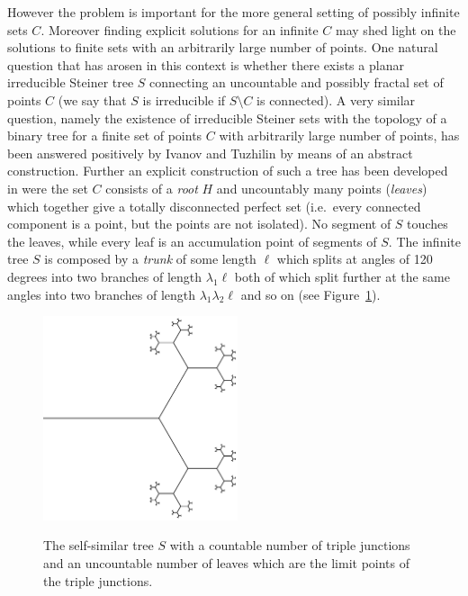 \documentclass{amsart}
\theoremstyle{definition}
\theoremstyle{remark}
\begin{document}
However the problem is important for the more general setting of possibly infinite 
sets $C$. 
Moreover finding explicit solutions for an infinite $C$ may shed light on 
the solutions to finite sets with an arbitrarily large number of points.
One natural question that has arosen in this context is 
whether there exists a planar irreducible Steiner tree $S$ connecting an uncountable 
and possibly fractal set of points $C$ 
(we say that $S$ is irreducible if $S\setminus C$ is 
connected).
A very similar question,
namely the existence of irreducible Steiner sets with the topology 
of a binary tree for a finite set of points $C$ with arbitrarily 
large number of points, has been answered positively by Ivanov and 
Tuzhilin \cite{IvaTuz94} by means of an abstract construction.
Further an explicit construction of such a tree has been developed
in \cite{PaoSteTep15} were the set $C$ consists of a \emph{root} $H$ and uncountably many
points (\emph{leaves}) which together give a totally disconnected perfect set 
(i.e.\ every connected component is a point, but the points are not isolated).
No segment of $S$
touches the leaves, while every leaf is an accumulation point of
segments of $S$.
The infinite tree $S$ 
is composed by a \emph{trunk} of
some length $\ell$ which splits at angles of 120 degrees 
into two branches of length $\lambda_1 \ell$ 
both of which split further at the same angles into two branches of length
$\lambda_1\lambda_2\ell$ and so on (see Figure~\ref{fig:tree}).
\begin{figure}
  \centering 
  \includegraphics[height=6cm]{tree.pdf}
  \label{fig:tree}
  \caption{The self-similar tree $S$ with a countable 
  number of triple junctions and an uncountable number 
  of leaves which are the limit points of the triple 
  junctions.}
\end{figure}
\end{document}
